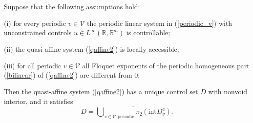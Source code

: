 \documentclass{siamltex}%
\begin{document}
\begin{theorem}
\label{Theorem7.2}Suppose that the following assumptions hold:

(i) for every periodic $v\in\mathcal{V}$ the periodic linear system in
(\ref{periodic_v}) with unconstrained controls $u\in L^{\infty}(\mathbb{R}%
,\mathbb{R}^{m})$ is controllable;

(ii) the quasi-affine system (\ref{qaffine2}) is locally accessible;

(iii) for all periodic $v\in\mathcal{V}$ all Floquet exponents of the periodic
homogeneous part (\ref{bilinear}) of (\ref{qaffine2}) are different from $0$;

Then the quasi-affine system (\ref{qaffine2}) has a unique control set $D$
with nonvoid interior, and it satisfies%
\[
\overline{D}=\overline{\bigcup\nolimits_{v\in\mathcal{V}\text{ periodic}}%
\pi_{2}(\mathrm{int}D_{v}^{a})}.
\]

\end{theorem}
\end{document}
